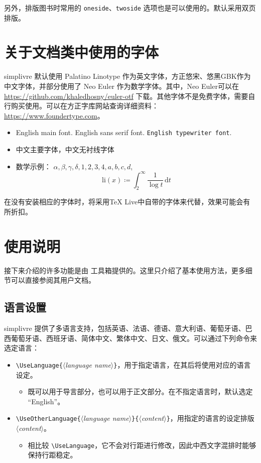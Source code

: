 \documentclass{simplivre}
\providecommand{\meta}[1]{$\langle${\normalfont\itshape#1}$\rangle$}
\newenvironment{tip}[1][提示]{%
    \LocallyStopLineNumbers%
    \begin{tcolorbox}[breakable,
        enhanced,
        width = \textwidth,
        colback = white, colbacktitle = paper,
        colframe = gray!50, boxrule=0.2mm,
        coltitle = black,
        fonttitle = \sffamily,
        attach boxed title to top left = {yshift=-\tcboxedtitleheight/2,  xshift=\tcboxedtitlewidth/4},
        boxed title style = {boxrule=0pt, colframe=paper},
        before skip = 0.3cm,
        after skip = 0.3cm,
        top = 3mm,
        bottom = 3mm,
        title={\sffamily #1}]%
}{\end{tcolorbox}\ResumeLineNumbers}
\providecommand{\simplivre}{\textsf{simplivre}}
\begin{document}
\bigskip
另外，排版图书时常用的 \texttt{oneside}、\texttt{twoside} 选项也是可以使用的。默认采用双页排版。

\chapter{关于文档类中使用的字体}
\simplivre{} 默认使用 Palatino Linotype 作为英文字体，方正悠宋、悠黑GBK作为中文字体，并部分使用了 Neo Euler 作为数学字体。其中，Neo Euler可以在 \url{https://github.com/khaledhosny/euler-otf} 下载。其他字体不是免费字体，需要自行购买使用。可以在方正字库网站查询详细资料：\url{https://www.foundertype.com}。

\begin{tip}[字体演示]
    \begin{itemize}
        \item English main font. \textsf{English sans serif font}. \texttt{English typewriter font}.
        \item 中文主要字体，\textsf{中文无衬线字体}
        \item 数学示例： \( \alpha, \beta, \gamma, \delta, 1,2,3,4, a,b,c,d \), \[\mathrm{li}(x)\coloneqq \int_2^{\infty} \frac{1}{\log t}\,\mathrm{d}t \]
    \end{itemize}
\end{tip}

\bigskip
在没有安装相应的字体时，将采用TeX Live中自带的字体来代替，效果可能会有所折扣。


\chapter{使用说明}

\vspace{-\baselineskip}

接下来介绍的许多功能是由 \ProjLib{} 工具箱提供的。这里只介绍了基本使用方法，更多细节可以直接参阅其用户文档。

\section{语言设置}

\simplivre{} 提供了多语言支持，包括英语、法语、德语、意大利语、葡萄牙语、巴西葡萄牙语、西班牙语、简体中文、繁体中文、日文、俄文。可以通过下列命令来选定语言：
\begin{itemize}
    \item \lstinline|\UseLanguage{|\meta{language name}\lstinline|}|，用于指定语言，在其后将使用对应的语言设定。
    \begin{itemize}
        \item 既可以用于导言部分，也可以用于正文部分。在不指定语言时，默认选定 “English”。
    \end{itemize}
    \item \lstinline|\UseOtherLanguage{|\meta{language name}\lstinline|}{|\meta{content}\lstinline|}|，用指定的语言的设定排版 \meta{content}。
    \begin{itemize}
        \item 相比较 \lstinline|\UseLanguage|，它不会对行距进行修改，因此中西文字混排时能够保持行距稳定。
    \end{itemize}
\end{itemize}
\end{document}
